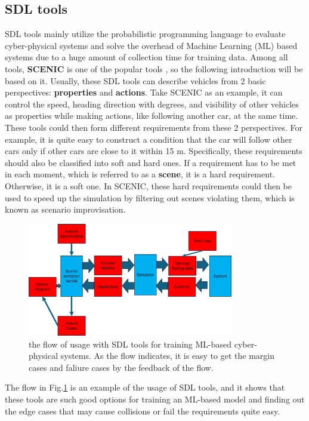 \documentclass[conference]{IEEEtran}
\begin{document}
\subsection{SDL tools}
SDL tools mainly utilize the probabilistic programming language to evaluate cyber-physical systems and solve the overhead of Machine Learning (ML) based systems due to a huge amount of collection time for training data. Among all tools, \textbf{SCENIC} is one of the popular tools  \cite{b6}, so the following introduction will be based on it.
Usually, these SDL tools can describe vehicles from 2 basic perspectives:  \textbf{properties} and  \textbf{actions}. Take SCENIC as an example, it can control the speed, heading direction with degrees, and visibility of other vehicles as properties while making actions, like following another car, at the same time. These tools could then form different requirements from these 2 perspectives. For example, it is quite easy to construct a condition that the car will follow other cars only if other cars are close to it within 15 m. Specifically, these requirements should also be classified into soft and hard ones. If a requirement has to be met in each moment, which is referred to as a \textbf{scene}, it is a hard requirement. Otherwise, it is a soft one. In SCENIC, these hard requirements could then be used to speed up the simulation by filtering out scenes violating them, which is known as scenario improvisation.
\begin{figure}[htbp]
\centerline{\includegraphics[width=90mm]{./pic/pic2_scenicflow.png}}
\caption{the flow of usage with SDL tools for training ML-based cyber-physical systems. As the flow indicates, it is easy to get the margin cases and faliure cases by the feedback of the flow.}
\label{fig2}
\end{figure}

The flow in Fig.\ref{fig2} is an example of the usage of SDL tools, and it shows that these tools are such good options for training an ML-based model and finding out the edge cases that may cause collisions or fail the requirements quite easy.
\end{document}
